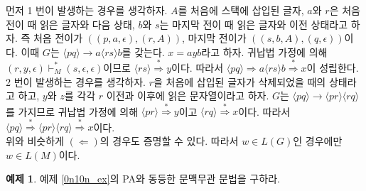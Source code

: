 \documentclass[b5paper, 11pt]{book}
\theoremstyle{definition}
\newtheorem{ex}[defn]{예제}
\newenvironment{pf*}{\pushQED{\qed}\pf}
{\popQED\endpf}
\begin{document}
\begin{pf*}
\begin{enumerate}
\end{enumerate}
먼저 1 번이 발생하는 경우를 생각하자. $A$를 처음에 스택에 삽입된 글자, $a$와 $r$은 처음 전이 때 읽은 글자와 다음 상태, $b$와 $s$는 마지막 전이 때 읽은 글자와 이전 상태라고 하자. 즉 처음 전이가 $((p, a, \epsilon), (r, A))$, 마지막 전이가 $((s,b,A),(q,\epsilon))$이다. 이때 $G$는 $\langle pq \rangle \rightarrow a \langle rs \rangle b$를 갖는다. $x = ayb$라고 하자. 귀납법 가정에 의해 $(r, y, \epsilon) \vdash_M^* (s,\epsilon , \epsilon)$이므로 $\langle rs \rangle \overset{*}{\Rightarrow} y$이다. 따라서 $\langle pq \rangle \Rightarrow a \langle rs \rangle b \overset{*}{\Rightarrow} x$이 성립한다. \\ 
2 번이 발생하는 경우를 생각하자. $r$을 처음에 삽입된 글자가 삭제되었을 때의 상태라고 하고, $y$와 $z$를 각각 $r$ 이전과 이후에 읽은 문자열이라고 하자. $G$는 $\langle pq \rangle \rightarrow \langle pr \rangle \langle rq \rangle$를 가지므로 귀납법 가정에 의해 $\langle pr \rangle \overset{*}{\Rightarrow} y$이고 $\langle rq \rangle \overset{*}{\Rightarrow} x$이다. 따라서 $\langle pq\rangle \overset{*}{\Rightarrow} \langle pr \rangle \langle rq \rangle \overset{*}{\Rightarrow} x$이다. \\
위와 비슷하게 $(\Leftarrow)$의 경우도 증명할 수 있다. 따라서 $w \in L(G)$인 경우에만 $w \in L(M)$이다. 
\end{pf*}
\begin{ex}
    예제 \ref{0n10n_ex}의 PA와 동등한 문맥무관 문법을 구하라. 
\end{ex}
\end{document}
